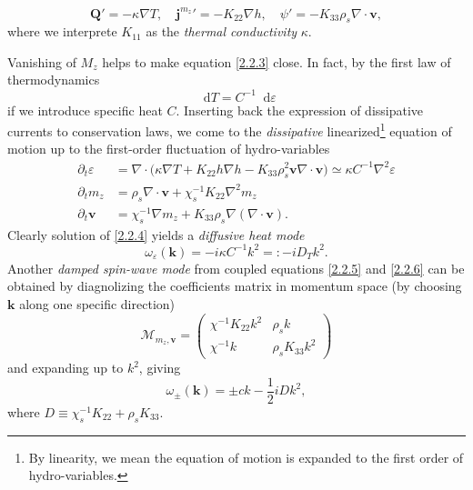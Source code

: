 \documentclass[10pt,nofootinbib]{revtex4}
\newcommand*\dd{\mathop{}\!\mathrm{d}}
\begin{document}
			\begin{equation}\label{2.2.3}
				\bm{Q}'=-\kappa\nabla T,\quad {\bm{j}^{m_z}}'=-K_{22}\nabla h,\quad \psi'=-K_{33}\rho_s\nabla\cdot\bm{v},
			\end{equation}
			where we interprete $K_{11}$ as the \emph{thermal conductivity} $\kappa$.\par
			Vanishing of $M_z$ helps to make equation \eqref{2.2.3} close. In fact, by the first law of thermodynamics
			\begin{equation*}
				\dd T=C^{-1}\dd\varepsilon
			\end{equation*}
			if we introduce specific heat $C$. Inserting back the expression of dissipative currents to conservation laws, we come to the \emph{dissipative} linearized\footnote{By linearity, we mean the equation of motion is expanded to the first order of hydro-variables.} equation of motion up to the first-order fluctuation of hydro-variables
			\begin{align}
				\partial_t \varepsilon&=\nabla\cdot\bigg(\kappa\nabla T+K_{22}h\nabla h-K_{33}\rho_s^2\bm{v}\nabla\cdot\bm{v}\bigg)\simeq\kappa C^{-1}\nabla^2\varepsilon\label{2.2.4}\\
				\partial_t m_z&=\rho_s\nabla\cdot\bm{v}+\chi_s^{-1}K_{22}\nabla^2m_z\label{2.2.5}\\
				\partial_t\bm{v}&=\chi_s^{-1}\nabla m_z+K_{33}\rho_s\nabla(\nabla\cdot\bm{v})\label{2.2.6}.
			\end{align}
			Clearly solution of \eqref{2.2.4} yields a \emph{diffusive heat mode}
			\begin{equation}\label{2.2.7}
				\omega_\varepsilon(\bm{k})=-i\kappa C^{-1}k^2=:-iD_Tk^2.
			\end{equation}
			Another \emph{damped spin-wave mode} from coupled equations \eqref{2.2.5} and \eqref{2.2.6} can be obtained by diagnolizing the coefficients matrix in momentum space (by choosing $\bm{k}$ along one specific direction)
			\begin{equation*}
				\mathcal{M}_{m_z,\bm{v}}=\left(\begin{array}{cc}
					\chi^{-1}K_{22}k^2 & \rho_s k \\
					\chi^{-1}k & \rho_s K_{33} k^2
				\end{array}\right)
			\end{equation*}
			and expanding up to $k^2$, giving
			\begin{equation}\label{2.2.8}
				\omega_{\pm}(\bm{k})=\pm ck-\dfrac{1}{2}iDk^2,
			\end{equation}
			where $D\equiv\chi_s^{-1}K_{22}+\rho_s K_{33}$.
	
\end{document}
